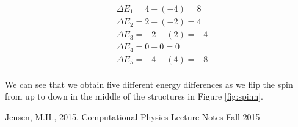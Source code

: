 \documentclass{article}
\begin{document}
\begin{equation}\label{eq:calc_dE}
\begin{split}
&\Delta E_1 = 4-(-4)=8\\
&\Delta E_2 = 2-(-2)=4\\
&\Delta E_3 = -2-(2)=-4\\
&\Delta E_4 = 0-0=0\\
&\Delta E_5 = -4-(4)=-8\\
\end{split}
\end{equation}

We can see that we obtain five different energy differences as we flip the spin from up to down in the middle of the structures in Figure \ref{fig:spinn}.

\begin{thebibliography}{9}
	Jensen, M.H., 2015, Computational Physics Lecture Notes Fall 2015
\end{thebibliography}
\end{document}
